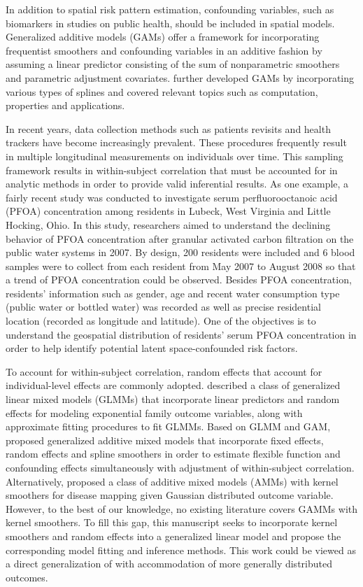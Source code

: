 	In addition to spatial risk pattern estimation, confounding variables, such as biomarkers in studies on public health, should be included in spatial models. Generalized additive models (GAMs) \citep{hastie1990generalized} offer a framework for incorporating frequentist smoothers and confounding variables in an additive fashion by assuming a linear predictor consisting of the sum of nonparametric smoothers and parametric adjustment covariates. \citet{wood2017generalized} further developed GAMs by incorporating various types of splines and covered relevant topics such as computation, properties and applications. 
	
	In recent years, data collection methods such as patients revisits and health trackers have become increasingly prevalent. These procedures frequently result in multiple longitudinal measurements on individuals over time. This sampling framework results in within-subject correlation that must be accounted for in analytic methods in order to provide valid inferential results. As one example, a fairly recent study was conducted to investigate serum perfluorooctanoic acid (PFOA) concentration among residents in Lubeck, West Virginia and Little Hocking, Ohio. \citep{bartell2010rate} In this study, researchers aimed to understand the declining behavior of PFOA concentration after granular activated carbon filtration on the public water systems in 2007. By design, 200 residents were included and 6 blood samples were to collect from each resident from May 2007 to August 2008 so that a trend of PFOA concentration could be observed. Besides PFOA concentration, residents' information such as gender, age and recent water consumption type (public water or bottled water) was recorded as well as precise residential location (recorded as longitude and latitude). One of the objectives is to understand the geospatial distribution of residents' serum PFOA concentration in order to help identify potential latent space-confounded risk factors. 
	
	To account for within-subject correlation, random effects that account for individual-level effects are commonly adopted. \citet{breslow1993approximate} described a class of generalized linear mixed models (GLMMs) that incorporate linear predictors and random effects for modeling exponential family outcome variables, along with approximate fitting procedures to fit GLMMs. Based on GLMM and GAM, \citet{lin1999inference} proposed generalized additive mixed models that incorporate fixed effects, random effects and spline smoothers in order to estimate flexible function and confounding effects simultaneously with adjustment of within-subject correlation. Alternatively, \citet{Tang2020Additive} proposed a class of additive mixed models (AMMs) with kernel smoothers for disease mapping given Gaussian distributed outcome variable. However, to the best of our knowledge, no existing literature covers GAMMs with kernel smoothers. To fill this gap, this manuscript seeks to incorporate kernel smoothers and random effects into a generalized linear model and propose the corresponding model fitting and inference methods. This work could be viewed as a direct generalization of \citet{Tang2020Additive} with accommodation of more generally distributed outcomes. 
	
